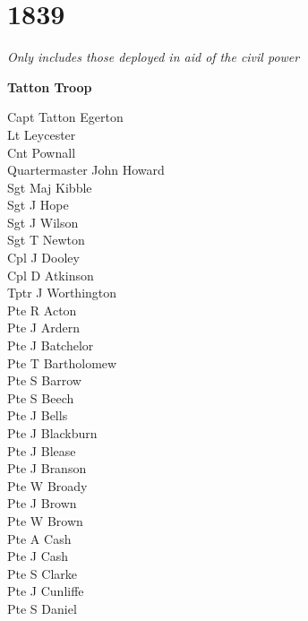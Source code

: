\chapter*{1839}

\vspace*{10mm}

\begin{center}
  \textit{Only includes those deployed in aid of the civil power}
\end{center}

\vspace*{5mm}

\begin{center}
  \Large
  \textbf{Tatton Troop}
\end{center}

\begin{multicols}{3}
  \small
  \noindent
  Capt Tatton Egerton \\
  Lt Leycester \\
  Cnt Pownall \\
  Quartermaster John Howard \\
  Sgt Maj Kibble \\
  Sgt J Hope \\
  Sgt J Wilson \\
  Sgt T Newton \\
  Cpl J Dooley \\
  Cpl D Atkinson \\
  Tptr J Worthington \\
  Pte R Acton \\
  Pte J Ardern \\
  Pte J Batchelor \\
  Pte T Bartholomew \\
  Pte S Barrow \\
  Pte S Beech \\
  Pte J Bells \\
  Pte J Blackburn \\
  Pte J Blease \\
  Pte J Branson \\
  Pte W Broady \\
  Pte J Brown \\
  Pte W Brown \\
  Pte A Cash \\
  Pte J Cash \\
  Pte S Clarke \\
  Pte J Cunliffe \\
  Pte S Daniel \\

\end{multicols}
